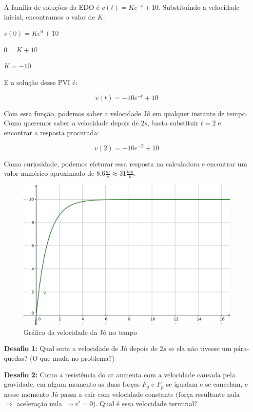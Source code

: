 \documentclass[a4paper]{article}
\begin{document}
A família de soluções da EDO é $v(t)=K e^{-t}+10$. Substituindo a
velocidade inicial, encontramos o valor de $K$:

$v(0) = K e^0 +10$

$0 = K+10$

$K=-10$

E a solução desse PVI é:

\begin{displaymath}
  v(t) = -10e^{-t}+10
\end{displaymath}

Com essa função, podemos saber a velocidade Jô em qualquer instante de
tempo. Como queremos saber a velocidade depois de $2s$, basta
substituir $t=2$ e encontrar a resposta procurada:

\begin{displaymath}
  v(2)=-10 e^{-2}+10
\end{displaymath}

Como curiosidade, podemos efeturar essa resposta na calculadora e
encontrar um valor numérico aproximado de
$8.6\frac{m}{s} \approx 31\frac{km}{h}$.

\begin{figure}[h]
  \centering
  \includegraphics[width=.9\textwidth]{pqd}
  \caption{Gráfico da velocidade da Jô no tempo}
  \label{fig:PQD}
\end{figure}

\hrulefill

{\bf Desafio 1:} Qual seria a velocidade de Jô depois de $2s$ se ela
não tivesse um pára-quedas? (O que muda no problema?)

\hrulefill

{\bf Desafio 2:} Como a resistência do ar aumenta com a velocidade
causada pela gravidade, em algum momento as duas forças $F_g$ e $F_p$
se igualam e se cancelam, e nesse momento Jô passa a cair com
velocidade constante (força resultante nula $\Rightarrow$ aceleração
nula $\Rightarrow v'=0$). Qual é essa velocidade terminal?
\end{document}
